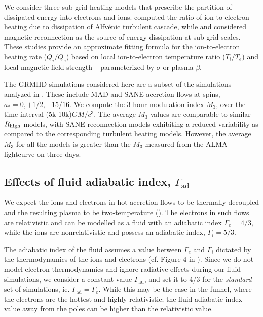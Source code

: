We consider three sub-grid heating models that prescribe the partition of dissipated energy into electrons and ions. \citealt{2010MNRAS.409L.104H} computed the ratio of ion-to-electron heating due to dissipation of Alfv\'enic turbulent cascade, while \citealt{10.1093/mnras/stx2530} and \citealt{Rowan_2017} considered magnetic reconnection as the source of energy dissipation at sub-grid scales. These studies provide an approximate fitting formula for the ion-to-electron heating rate ($Q_{i}/Q_{e}$) based on local ion-to-electron temperature ratio ($T_{i}/T_{e}$) and local magnetic field strength -- parameterized by $\sigma$ or plasma $\beta$.

The GRMHD simulations considered here are a subset of the simulations analyzed in \citealt{2020MNRAS.494.4168D}. These include MAD and SANE accretion flows at spins, $a_{*}=0,+1/2,+15/16$. We compute the 3 hour modulation index $M_{3}$, over the time interval (5k-10k)$GM/c^{3}$. The average $M_{3}$ values are comparable to similar $R_\mathrm{high}$ models, with SANE reconnection models exhibiting a reduced variability as compared to the corresponding turbulent heating models. However, the average $M_{3}$ for all the models is greater than the $M_{3}$ measured from the ALMA lightcurve on three days.

\subsection{Effects of fluid adiabatic index, \texorpdfstring{$\Gamma_\mathrm{ad}$}{Gad}}

We expect the ions and electrons in hot accretion flows to be thermally decoupled and the resulting plasma to be two-temperature (\citealt{1976ApJ...204..187S, Quataert_1998, 10.1093/mnras/stw3116, Ryan_2018}). The electrons in such flows are relativistic and can be modelled as a fluid with an adiabatic index $\Gamma_{e}=4/3$, while the ions are nonrelativistic and possess an adiabatic index, $\Gamma_{i}=5/3$.

The adiabatic index of the fluid assumes a value between $\Gamma_{e}$ and $\Gamma_{i}$ dictated by the thermodynamics of the ions and electrons (cf. Figure 4 in \citealt{10.1093/mnras/stw3116}). Since we do not model electron thermodynamics and ignore radiative effects during our fluid simulations, we consider a constant value $\Gamma_\mathrm{ad}$, and set it to 4/3 for the \textit{standard} set of simulations, ie. $\Gamma_\mathrm{ad}=\Gamma_{e}$. While this may be the case in the funnel, where the electrons are the hottest and highly relativistic; the fluid adiabatic index value away from the poles can be higher than the relativistic value.

